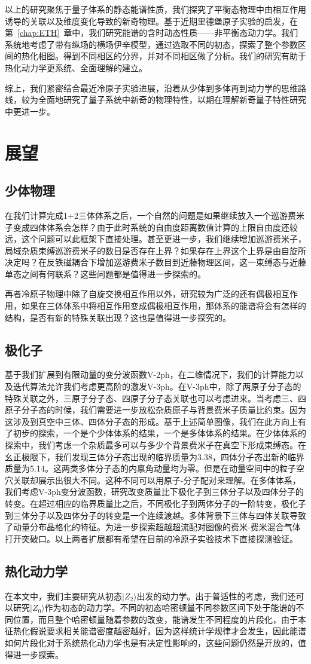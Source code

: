 以上的研究聚焦于量子体系的静态能谱性质，我们探究了平衡态物理中由相互作用诱导的关联以及维度变化导致的新奇物理。基于近期里德堡原子实验的启发，在第~\ref{chap:ETH}~章中，我们研究能谱的含时动态性质——非平衡态动力学。我们系统地考虑了带有纵场的横场伊辛模型，通过选取不同的初态，探索了整个参数区间的热化相图。得到不同相区的分界，并对不同相区做了分析。我们的研究有助于热化动力学更系统、全面理解的建立。

综上，我们紧密结合最近冷原子实验进展，沿着从少体到多体再到动力学的思维路线，较为全面地研究了量子系统中新奇的物理特性，以期在理解新奇量子特性研究中更进一步。


\section{展望}
\subsection{少体物理}
在我们计算完成1+2三体体系之后，一个自然的问题是如果继续放入一个巡游费米子变成四体体系会怎样？由于此时系统的自由度距离数值计算的上限自由度还较远，这个问题可以此框架下直接处理。甚至更进一步，我们继续增加巡游费米子，局域杂质束缚巡游费米子的数目是否存在上界？如果存在上界这个上界是由自旋所决定吗？在反铁磁耦合下增加巡游费米子数目到近藤物理区间，这一束缚态与近藤单态之间有何联系？这些问题都是值得进一步探索的。

再者冷原子物理中除了自旋交换相互作用以外，研究较为广泛的还有偶极相互作用，如果在三体体系中将相互作用变成偶极相互作用，那体系的能谱将会有怎样的结构，是否有新的特殊关联出现？这也是值得进一步探究的。

\subsection{极化子}
基于我们扩展到有限动量的变分波函数V-2ph，在二维情况下，我们的计算能力以及迭代算法允许我们考虑更高阶的激发V-3ph。在V-3ph中，除了两原子分子态的特殊关联之外，三原子分子态、四原子分子态关联也可以考虑进来。当考虑三、四原子分子态的时候，我们需要进一步放松杂质原子与背景费米子质量比约束。因为这涉及到真空中三体、四体分子态的形成。基于上述简单图像，我们在此方向上有了初步的探索，一个是个少体体系的结果\cite{RuijinUniversal}，一个是多体体系的结果\cite{RuijinEmergence}。在少体体系的探索中，我们考虑一个杂质最多可以与多少个背景费米子在真空下形成束缚态。在幺正极限下，我们发现三体分子态出现的临界质量为3.38，四体分子态出新的临界质量为5.14。这两类多体分子态的内禀角动量均为零。但是在动量空间中的粒子空穴关联却展示出很大不同。这种不同可以用原子-分子配对来理解。在多体体系，我们考虑V-3ph变分波函数，研究改变质量比下极化子到三体分子以及四体分子的转变。在超过相应的临界质量比之后，不同极化子到两体分子的一阶转变，极化子到三体分子以及四体分子的转变是一个连续渡越。多体背景下三体与四体关联导致了动量分布晶格化的特征。为进一步探索超越超流配对图像的费米-费米混合气体打开突破口。以上两者扩展都有希望在目前的冷原子实验技术下直接探测验证。

\subsection{热化动力学}
在本文中，我们主要研究从初态$|Z_2\rangle$出发的动力学。出于普适性的考虑，我们还可以研究$|Z_0\rangle$作为初态的动力学。不同的初态哈密顿量不同参数区间下处于能谱的不同位置，而且整个哈密顿量随着参数的改变，能谱发生不同程度的片段化，由于本征热化假说要求相关能谱密度越密越好，因为这样统计学规律才会发生，因此能谱如何片段化对于系统热化动力学也是有决定性影响的，这些问题仍然是开放的，值得进一步探索。
